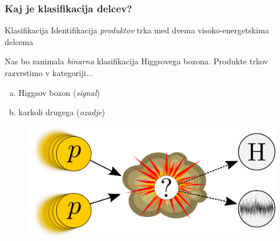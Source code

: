 \documentclass[14pt, t]{beamer}
\begin{document}
\begin{frame}
    \frametitle{Kaj je klasifikacija delcev?}

    \begin{block}{Klasifikacija}
        Identifikacija \textit{produktov} trka med dvema visoko-energetskima delcema
    \end{block}

    \pause
    \vspace{2mm}
    Nas bo zanimala \textit{binarna} klasifikacija Higgsovega bozona. Produkte trkov razvrstimo v kategoriji...
    \vspace{1mm}
    \begin{enumerate}[(a)]
    
        \item Higgsov bozon (\textit{signal})

        \item karkoli drugega (\textit{ozadje})
    
    \end{enumerate}
    \vspace{-2mm}
    \begin{figure}
        \centering
        \includegraphics[width=0.65\linewidth]{vector/figures-presentation/classification.png}
    \end{figure}
\end{frame}
\end{document}
